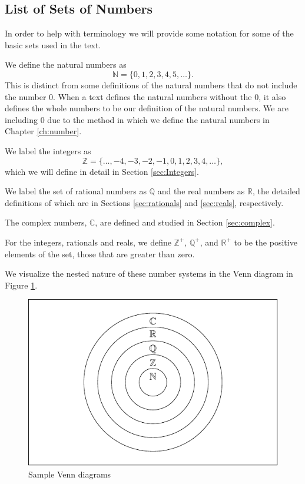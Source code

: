 \documentclass[
]{book}
\theoremstyle{definition}
\theoremstyle{definition}
\theoremstyle{definition}
\theoremstyle{remark}
\begin{document}
\hypertarget{list-of-sets-of-numbers}{%
\subsection{List of Sets of Numbers}\label{list-of-sets-of-numbers}}

In order to help with terminology we will provide some notation for some of the basic sets used in the text.

We define the natural numbers as
\[\mathbb{N}=\{0,1,2,3,4,5,\ldots\}.\]
This is distinct from some definitions of the natural numbers that do not include the number \(0\). When a text defines the natural numbers without the \(0\), it also defines the whole numbers to be our definition of the natural numbers. We are including \(0\) due to the method in which we define the natural numbers in Chapter \ref{ch:number}.

We label the integers as \[\mathbb{Z} = \{\ldots, -4, -3, -2, -1, 0, 1, 2, 3, 4, \ldots\},\] which we will define in detail in Section \ref{sec:Integers}.

We label the set of rational numbers as \(\mathbb{Q}\) and the real numbers as \(\mathbb{R}\), the detailed definitions of which are in Sections \ref{sec:rationals} and \ref{sec:reals}, respectively.

The complex numbers, \(\mathbb{C}\), are defined and studied in Section \ref{sec:complex}.

For the integers, rationals and reals, we define \(\mathbb{Z}^+\), \(\mathbb{Q}^+\), and \(\mathbb{R}^+\) to be the positive elements of the set, those that are greater than zero.

We visualize the nested nature of these number systems in the Venn diagram in Figure \ref{fig:venn-numbers}.

\begin{figure}

{\centering \includegraphics[width=0.7\linewidth]{tikz/vennNumberSystems} 

}

\caption{Sample Venn diagrams}\label{fig:venn-numbers}
\end{figure}
\end{document}
